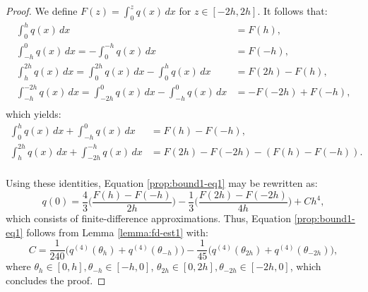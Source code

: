 \begin{proof}
	We define $F(z) = \int_{0}^{z} q(x) \,dx $ for $z \in [-2h, 2h]$. 
	It follows that:
	\begin{align*}
		\int_{ 0}^{h}   q(x) \,dx &= F(h),\\
		\int_{-h}^{0}   q(x) \,dx = -\int_{ 0}^{-h} q(x)  \,dx  &= F(-h),\\ 
		\int_{ h}^{2h}  q(x) \,dx =  \int_{ 0}^{2h} q(x)  \,dx - \int_{ 0}^{h} q(x) \,dx  &= F(2h) - F(h),\\ 
		\int_{-h}^{-2h} q(x) \,dx =  \int_{-2h }^{0} q(x) \,dx - \int_{-h}^{0} q(x) \,d x&= -F(-2h) + F(-h),\\ 
	\end{align*}
	which yields:
	\begin{align*}
		\int_{0}^{h} q(x) \,dx + \int_{-h}^{0} q(x) \,dx &=
		F(h) - F(-h), \\
		\int_{h}^{2h} q(x) \,dx + \int_{-2h}^{-h} q(x) \,dx &=
		F(2h) - F(-2h) - (F(h) - F(-h)). \\
	\end{align*}
	
	Using these identities, Equation \eqref{prop:bound1-eq1} may be rewritten as:
	\begin{equation}
		\label{prop:bound1-eq2}
		q(0) = \frac{4}{3} \bigg(\frac{F(h) - F(-h)}{2h}\bigg)
		       - \frac{1}{3} \bigg(\frac{F(2h) - F(-2h)}{4h}\bigg)
+ Ch^4,
	\end{equation}
	which consists of finite-difference approximations. 
	Thus, Equation \eqref{prop:bound1-eq1} follows from Lemma \ref{lemma:fd-est1}
	with:
	\begin{equation}
		\label{prop:bound1-eq3}
		C = \frac{1}{240}\bigg( q^{(4)}(\theta_{h}) + q^{(4)}(\theta_{-h})\bigg)
		- \frac{1}{45}\bigg( q^{(4)}(\theta_{2h}) + q^{(4)}(\theta_{-2h})\bigg), 
	\end{equation}
	where $\theta_{h} \in [0,h], \theta_{-h}\in [-h,0]$, 
	$\theta_{2h} \in [0,2h], \theta_{-2h}\in [-2h,0]$,
	which concludes the proof.

  \renewcommand\qedsymbol{} %
\end{proof}